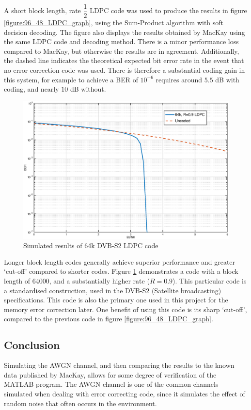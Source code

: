 \documentclass[11pt]{article}
\numberwithin{equation}{subsection}
\begin{document}
A short block length, rate $\dfrac{1}{2}$ LDPC code was used to produce the results in figure \ref{figure:96_48_LDPC_graph}, using the Sum-Product algorithm with soft decision decoding. The figure also displays the results obtained by MacKay using the same LDPC code and decoding method. There is a minor performance loss compared to MacKay, but otherwise the results are in agreement. Additionally, the dashed line indicates the {theoretical} expected bit error rate in the event that no error correction code was used. There is therefore a substantial coding gain in this system, for example to achieve a BER of $10^{-6}$ requires around $5.5$ dB with coding, and nearly $10$ dB without.

\begin{figure}[h]
\centering
\includegraphics[scale=0.6]{dvbs2_graph}
\caption{Simulated results of 64k DVB-S2 LDPC code}
\label{figure:64k_LDPC_graph}
\end{figure}

Longer block length codes generally achieve superior performance and greater `cut-off' compared to shorter codes. Figure \ref{figure:64k_LDPC_graph} demonstrates a code with a block length of $64000$, and a substantially higher rate ($R=0.9$). This particular code is a standardised construction, used in the DVB-S2 (Satellite broadcasting) specifications. This code is also the primary one used in this project for the memory error correction later. One benefit of using this code is its sharp `cut-off', compared to the previous code in figure \ref{figure:96_48_LDPC_graph}.

\subsection{Conclusion}
Simulating the AWGN channel, and then comparing the results to the known data published by MacKay, allows for some degree of verification of the MATLAB program. The AWGN channel is one of the common channels simulated when dealing with error correcting code, since it simulates the effect of random noise that often occurs in the environment. 
\end{document}
